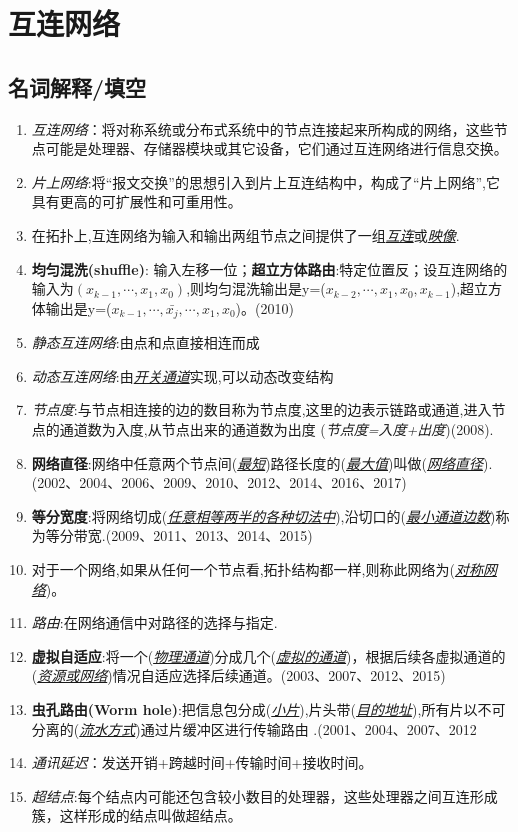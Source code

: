 \documentclass[a4paper]{ctexbook}
\newcommand{\blank}[1]{(\emph{\underline{#1}})}
\begin{document}
\newpage
\chapter{互连网络}
\section{名词解释/填空}
\begin{enumerate}
  \item \emph{互连网络}：将对称系统或分布式系统中的节点连接起来所构成的网络，这些节点可能是处理器、存储器模块或其它设备，它们通过互连网络进行信息交换。
  \item \emph{片上网络}:将“报文交换”的思想引入到片上互连结构中，构成了“片上网络”,它具有更高的可扩展性和可重用性。
  \item 在拓扑上,互连网络为输入和输出两组节点之间提供了一组\emph{\underline{互连}}或\emph{\underline{映像}}.
  \item \textbf{均匀混洗(shuffle)}: 输入左移一位；\textbf{超立方体路由}:特定位置反；设互连网络的输入为$(x_{k-1},\cdots,x_1,x_0)$,则均匀混洗输出是y=\blank{$x_{k-2},\cdots,x_1,x_0,x_{k-1}$},超立方体输出是y=\blank{$x_{k-1},\cdots,\bar{x_j},\cdots,x_1,x_0$}。(2010)
  \item \emph{静态互连网络}:由点和点直接相连而成
  \item \emph{动态互连网络}:由\underline{\emph{开关通道}}实现,可以动态改变结构
  \item \emph{节点度}:与节点相连接的边的数目称为节点度,这里的边表示链路或通道,进入节点的通道数为入度,从节点出来的通道数为出度
  (\emph{节点度=入度+出度})(2008).
  \item \textbf{网络直径}:网络中任意两个节点间\blank{最短}路径长度的\blank{最大值}叫做(\emph{\underline{网络直径}}).(2002、2004、2006、2009、2010、2012、2014、2016、2017)
  \item \textbf{等分宽度}:将网络切成\blank{任意相等两半的各种切法中},沿切口的\blank{最小通道边数}称为等分带宽.(2009、2011、2013、2014、2015)
  \item 对于一个网络,如果从任何一个节点看,拓扑结构都一样,则称此网络为\blank{对称网络}。
  \item \emph{路由}:在网络通信中对路径的选择与指定.
  \item \textbf{虚拟自适应}:将一个\blank{物理通道}分成几个\blank{虚拟的通道}，根据后续各虚拟通道的\blank{资源或网络}情况自适应选择后续通道。(2003、2007、2012、2015)
  \item \textbf{虫孔路由(Worm hole)}:把信息包分成(\emph{\underline{小片}}),片头带(\emph{\underline{目的地址}}),所有片以不可分离的(\emph{\underline{流水方式}})通过片缓冲区进行传输路由 .(2001、2004、2007、2012
  \item \emph{通讯延迟}：发送开销+跨越时间+传输时间+接收时间。
  \item \emph{超结点}:每个结点内可能还包含较小数目的处理器，这些处理器之间互连形成簇，这样形成的结点叫做超结点。
\end{enumerate}
\end{document}

